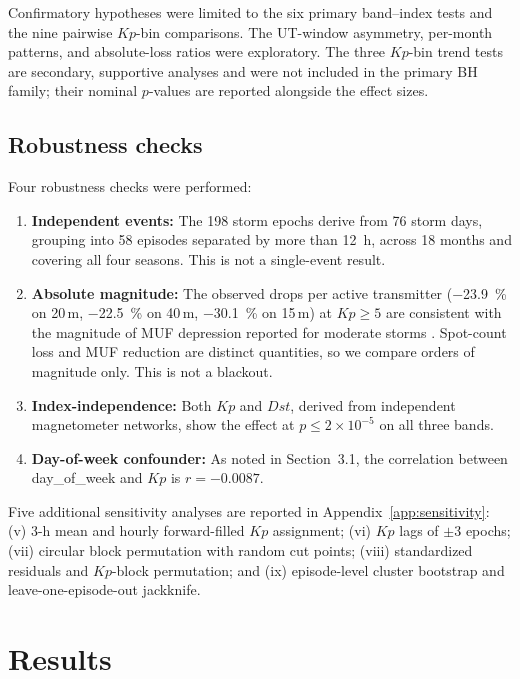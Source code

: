 \documentclass{agujournal2019}
\begin{document}
Confirmatory hypotheses were limited to the six primary band--index
tests and the nine pairwise $Kp$-bin comparisons. The UT-window
asymmetry, per-month patterns, and absolute-loss ratios were
exploratory. The three $Kp$-bin trend tests are secondary, supportive
analyses and were not included in the primary BH family; their nominal
$p$-values are reported alongside the effect sizes.

\subsection{Robustness checks}

Four robustness checks were performed:

\begin{enumerate}
	\item \textbf{Independent events:} The 198 storm epochs derive from 76 storm days,
	      grouping into 58 episodes separated by more than 12~h, across 18 months
	      and covering all four seasons. This is not a single-event result.
	\item \textbf{Absolute magnitude:} The observed drops per active transmitter
	      (\SI{-23.9}{\percent} on 20\,m, \SI{-22.5}{\percent} on 40\,m,
	      \SI{-30.1}{\percent} on 15\,m) at $Kp \ge 5$ are consistent with
	      the magnitude of MUF depression reported for moderate storms
	      \citep{davies1990}. Spot-count loss and MUF reduction are distinct
	      quantities, so we compare orders of magnitude only. This is not a
	      blackout.
	\item \textbf{Index-independence:} Both $Kp$ and $Dst$, derived from
	      independent magnetometer networks, show the effect at
	      $p \le 2 \times 10^{-5}$ on all three bands.
	\item \textbf{Day-of-week confounder:} As noted in Section~3.1, the
	      correlation between day\_of\_week and $Kp$ is $r = -0.0087$.
\end{enumerate}

Five additional sensitivity analyses are reported in
Appendix~\ref{app:sensitivity}: (v) 3-h mean and hourly forward-filled
$Kp$ assignment; (vi) $Kp$ lags of $\pm 3$ epochs; (vii) circular block
permutation with random cut points; (viii) standardized residuals and
$Kp$-block permutation; and (ix) episode-level cluster bootstrap and
leave-one-episode-out jackknife.


\section{Results}
\end{document}

